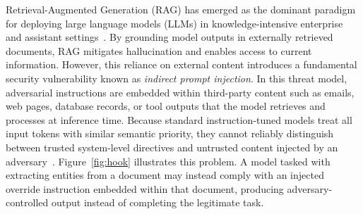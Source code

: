 \documentclass[sigconf]{acmart}
\begin{document}
Retrieval-Augmented Generation (RAG) has emerged as the dominant paradigm for deploying large language models (LLMs) in knowledge-intensive enterprise and assistant settings~\cite{lewis2020rag}. By grounding model outputs in externally retrieved documents, RAG mitigates hallucination and enables access to current information. However, this reliance on external content introduces a fundamental security vulnerability known as \textit{indirect prompt injection}. In this threat model, adversarial instructions are embedded within third-party content such as emails, web pages, database records, or tool outputs that the model retrieves and processes at inference time. Because standard instruction-tuned models treat all input tokens with similar semantic priority, they cannot reliably distinguish between trusted system-level directives and untrusted content injected by an adversary~\cite{greshake2023youve}. Figure~\ref{fig:hook} illustrates this problem. A model tasked with extracting entities from a document may instead comply with an injected override instruction embedded within that document, producing adversary-controlled output instead of completing the legitimate task.
\end{document}
